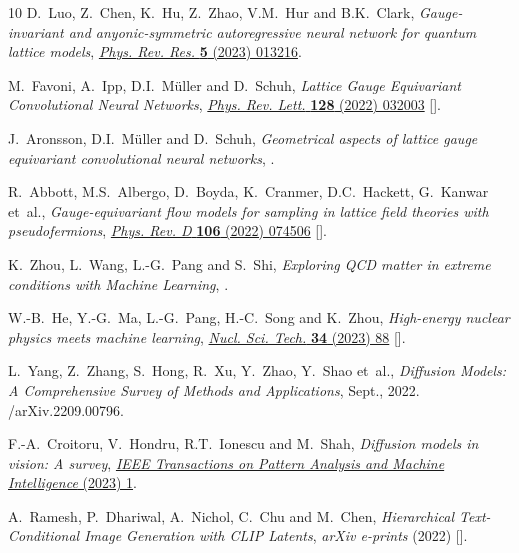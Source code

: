 \begin{thebibliography}{10}
D.~Luo, Z.~Chen, K.~Hu, Z.~Zhao, V.M.~Hur and B.K.~Clark,
  \emph{{Gauge-invariant and anyonic-symmetric autoregressive neural network
  for quantum lattice models}},
  \href{https://doi.org/10.1103/PhysRevResearch.5.013216}{\emph{Phys. Rev.
  Res.} {\bfseries 5} (2023) 013216}.

M.~Favoni, A.~Ipp, D.I.~M{\"u}ller and D.~Schuh, \emph{Lattice {{Gauge
  Equivariant Convolutional Neural Networks}}},
  \href{https://doi.org/10.1103/PhysRevLett.128.032003}{\emph{Phys. Rev. Lett.}
  {\bfseries 128} (2022) 032003}
  [\href{https://arxiv.org/abs/2012.12901}{{}}].

J.~Aronsson, D.I.~M\"uller and D.~Schuh, \emph{{Geometrical aspects of lattice
  gauge equivariant convolutional neural networks}},
  \href{https://arxiv.org/abs/2303.11448}{{}}.

R.~Abbott, M.S.~Albergo, D.~Boyda, K.~Cranmer, D.C.~Hackett, G.~Kanwar et~al.,
  \emph{Gauge-equivariant flow models for sampling in lattice field theories
  with pseudofermions},
  \href{https://doi.org/10.1103/PhysRevD.106.074506}{\emph{Phys. Rev. D}
  {\bfseries 106} (2022) 074506}
  [\href{https://arxiv.org/abs/2207.08945}{{}}].

K.~Zhou, L.~Wang, L.-G.~Pang and S.~Shi, \emph{{Exploring QCD matter in extreme
  conditions with Machine Learning}},
  \href{https://arxiv.org/abs/2303.15136}{{}}.

W.-B.~He, Y.-G.~Ma, L.-G.~Pang, H.-C.~Song and K.~Zhou, \emph{{High-energy
  nuclear physics meets machine learning}},
  \href{https://doi.org/10.1007/s41365-023-01233-z}{\emph{Nucl. Sci. Tech.}
  {\bfseries 34} (2023) 88} [\href{https://arxiv.org/abs/2303.06752}{{}}].

L.~Yang, Z.~Zhang, S.~Hong, R.~Xu, Y.~Zhao, Y.~Shao et~al., \emph{Diffusion
  {{Models}}: {{A Comprehensive Survey}} of {{Methods}} and {{Applications}}},
  Sept., 2022.
/arXiv.2209.00796.

F.-A.~Croitoru, V.~Hondru, R.T.~Ionescu and M.~Shah, \emph{Diffusion models in
  vision: A survey},
  \href{https://doi.org/10.1109/TPAMI.2023.3261988}{\emph{IEEE Transactions on
  Pattern Analysis and Machine Intelligence} (2023) 1}.

A.~{Ramesh}, P.~{Dhariwal}, A.~{Nichol}, C.~{Chu} and M.~{Chen},
  \emph{{Hierarchical Text-Conditional Image Generation with CLIP Latents}},
  {\emph{arXiv e-prints} (2022) }
  [\href{https://arxiv.org/abs/2204.06125}{{}}].


\end{thebibliography}
